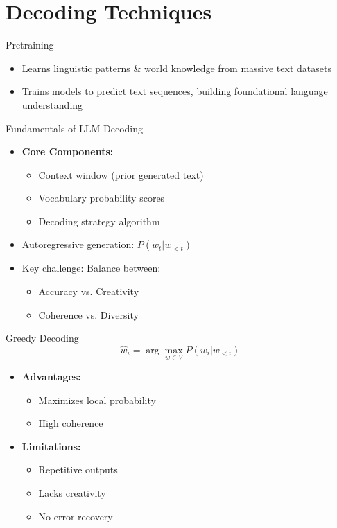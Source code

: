 \section{Decoding Techniques}

\begin{frame}{Pretraining}
\begin{itemize}
\item Learns linguistic patterns \& world knowledge from massive text datasets
\item Trains models to predict text sequences, building foundational language understanding
\end{itemize}
\end{frame}
\begin{frame}{Fundamentals of LLM Decoding}
\begin{itemize}
\item \textbf{Core Components:}
\begin{itemize}
\item Context window (prior generated text)
\item Vocabulary probability scores
\item Decoding strategy algorithm
\end{itemize}
\item Autoregressive generation: $P(w_t|w_{<t})$
\item Key challenge: Balance between:
\begin{itemize}
\item Accuracy vs. Creativity
\item Coherence vs. Diversity
\end{itemize}
\end{itemize}
\end{frame}


\begin{frame}{Greedy Decoding}
\[
\hat{w}_i = \arg\max_{w \in V} P(w_i|w_{<i})
\]
\begin{itemize}
\item \textbf{Advantages:}
\begin{itemize}
\item Maximizes local probability
\item High coherence
\end{itemize}
\item \textbf{Limitations:}
\begin{itemize}
\item Repetitive outputs
\item Lacks creativity
\item No error recovery
\end{itemize}
\end{itemize}
\end{frame}

